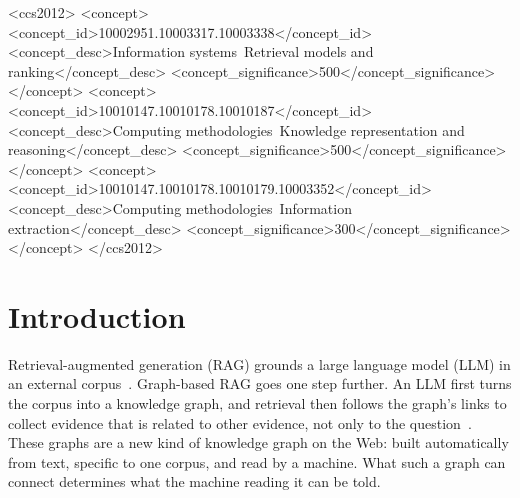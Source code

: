 \documentclass[sigconf, review, anonymous]{acmart}
\begin{document}
\begin{CCSXML}
<ccs2012>
   <concept>
       <concept_id>10002951.10003317.10003338</concept_id>
       <concept_desc>Information systems~Retrieval models and ranking</concept_desc>
       <concept_significance>500</concept_significance>
   </concept>
   <concept>
       <concept_id>10010147.10010178.10010187</concept_id>
       <concept_desc>Computing methodologies~Knowledge representation and reasoning</concept_desc>
       <concept_significance>500</concept_significance>
   </concept>
   <concept>
       <concept_id>10010147.10010178.10010179.10003352</concept_id>
       <concept_desc>Computing methodologies~Information extraction</concept_desc>
       <concept_significance>300</concept_significance>
   </concept>
</ccs2012>
\end{CCSXML}



\maketitle

\section{Introduction}

Retrieval-augmented generation (RAG) grounds a large language model (LLM) in an external corpus~\cite{lewis2020retrieval}. Graph-based RAG goes one step further. An LLM first turns the corpus into a knowledge graph, and retrieval then follows the graph's links to collect evidence that is related to other evidence, not only to the question~\cite{peng2025graph,han2024retrieval,edge2024local,gutierrez2025rag}. These graphs are a new kind of knowledge graph on the Web: built automatically from text, specific to one corpus, and read by a machine. What such a graph can connect determines what the machine reading it can be told.
\end{document}
